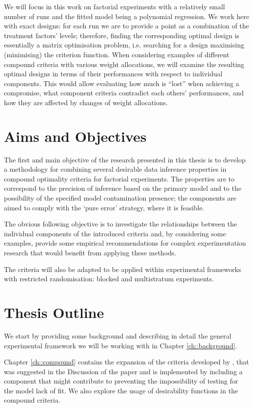 We will focus in this work on factorial experiments with a relatively small number of runs and the fitted model being a polynomial regression. We work here with exact designs: for each run we are to provide a point as a combination of the treatment factors' levels; therefore, finding the corresponding optimal design is essentially a matrix optimisation problem, i.e. searching for a design maximising (minimising) the criterion function. When considering examples of different compound criteria with various weight allocations, we will examine the resulting optimal designs in terms of their performances with respect to individual components. This would allow evaluating how much is ``lost'' when achieving a compromise, what component criteria contradict each others' performances, and how they are affected by changes of weight allocations.

\section{Aims and Objectives}

The first and main objective of the research presented in this thesis is to develop a methodology for combining several desirable data inference properties in compound optimality criteria for factorial experiments. The properties are to correspond to the precision of inference based on the primary model and to the possibility of the specified model contamination presence; the components are aimed to comply with the `pure error' strategy, where it is feasible.

The obvious following objective is to investigate the relationships between the individual components of the introduced criteria and, by considering some examples, provide some empirical recommendations for complex experimentation research that would benefit from applying these methods.

The criteria will also be adapted to be applied within experimental frameworks with restricted randomisation: blocked and multistratum experiments.

\section{Thesis Outline}

We start by providing some background and describing in detail the general experimental framework we will be working with in Chapter \ref{ch::background}. 

Chapter \ref{ch::compound} contains the expansion of the criteria developed by \cite{GilmourTrinca2012}, that was suggested in the Discussion of the paper and is implemented by including a component that might contribute to preventing the impossibility of testing for the model lack of fit. We also explore the usage of desirability functions in the compound criteria.

